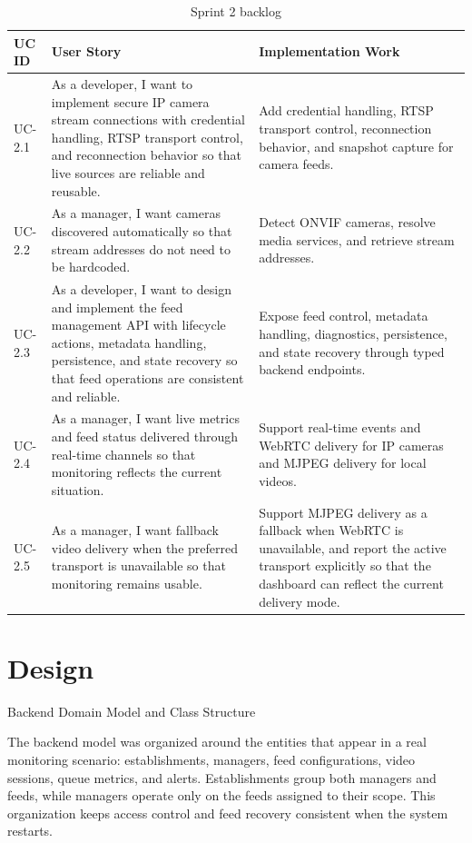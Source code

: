 \begin{table}[H]
    \centering
    \begingroup\setlength{\tabcolsep}{4pt}\renewcommand{\arraystretch}{0.95}\footnotesize
    \begin{tabularx}{\textwidth}{|l|X|X|}
        \hline
        UC ID & User Story & Implementation Work \\ \hline
        UC-2.1 & As a developer, I want to implement secure IP camera stream connections with credential handling, RTSP transport control, and reconnection behavior so that live sources are reliable and reusable. & Add credential handling, RTSP transport control, reconnection behavior, and snapshot capture for camera feeds. \\ \hline
        UC-2.2 & As a manager, I want cameras discovered automatically so that stream addresses do not need to be hardcoded. & Detect ONVIF cameras, resolve media services, and retrieve stream addresses. \\ \hline
        UC-2.3 & As a developer, I want to design and implement the feed management API with lifecycle actions, metadata handling, persistence, and state recovery so that feed operations are consistent and reliable. & Expose feed control, metadata handling, diagnostics, persistence, and state recovery through typed backend endpoints. \\ \hline
        UC-2.4 & As a manager, I want live metrics and feed status delivered through real-time channels so that monitoring reflects the current situation. & Support real-time events and WebRTC delivery for IP cameras and MJPEG delivery for local videos. \\ \hline
        UC-2.5 & As a manager, I want fallback video delivery when the preferred transport is unavailable so that monitoring remains usable. & Support MJPEG delivery as a fallback when WebRTC is unavailable, and report the active transport explicitly so that the dashboard can reflect the current delivery mode. \\ \hline
    \end{tabularx}
    \caption{Sprint 2 backlog}
    \label{tab:sprint2_backlog}
    \endgroup
\end{table}

\section{Design}

Backend Domain Model and Class Structure

The backend model was organized around the entities that appear in a real monitoring scenario: establishments, managers, feed configurations, video sessions, queue metrics, and alerts. Establishments group both managers and feeds, while managers operate only on the feeds assigned to their scope. This organization keeps access control and feed recovery consistent when the system restarts.

